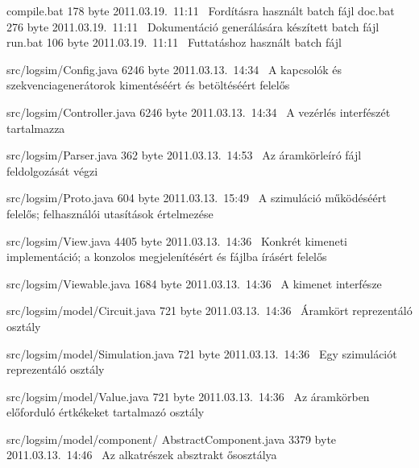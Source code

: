\begin{fajllista}

\fajl
{compile.bat} %
{178 byte} %
{2011.03.19.~11:11~} %
{Fordításra használt batch fájl} %
\fajl
{doc.bat} %
{276 byte} %
{2011.03.19.~11:11~} %
{Dokumentáció generálására készített batch fájl} %
\fajl
{run.bat} %
{106 byte} %
{2011.03.19.~11:11~} %
{Futtatáshoz használt batch fájl} %

\fajl
{src/logsim/Config.java} %
{6246 byte} %
{2011.03.13.~14:34~} %
{A kapcsolók és szekvenciagenerátorok kimentéséért és betöltéséért felelős} %

\fajl
{src/logsim/Controller.java} %
{6246 byte} %
{2011.03.13.~14:34~} %
{A vezérlés interfészét tartalmazza} %

\fajl
{src/logsim/Parser.java} %
{362 byte} %
{2011.03.13.~14:53~} %
{Az áramkörleíró fájl feldolgozását végzi} %

\fajl
{src/logsim/Proto.java} %
{604 byte} %
{2011.03.13.~15:49~} %
{A szimuláció működéséért felelős; felhasználói utasítások értelmezése} %

\fajl
{src/logsim/View.java} %
{4405 byte} %
{2011.03.13.~14:36~} %
{Konkrét kimeneti implementáció; a konzolos megjelenítésért és fájlba írásért felelős} %

\fajl
{src/logsim/Viewable.java} %
{1684 byte} %
{2011.03.13.~14:36~} %
{A kimenet interfésze} %

\fajl
{src/logsim/model/Circuit.java} %
{721 byte} %
{2011.03.13.~14:36~} %
{Áramkört reprezentáló osztály} %

\fajl
{src/logsim/model/Simulation.java} %
{721 byte} %
{2011.03.13.~14:36~} %
{Egy szimulációt reprezentáló osztály} %

\fajl
{src/logsim/model/Value.java} %
{721 byte} %
{2011.03.13.~14:36~} %
{Az áramkörben előforduló értkékeket tartalmazó osztály} %

\fajl
{src/logsim/model/component/\newline
AbstractComponent.java} %
{3379 byte} %
{2011.03.13.~14:46~} %
{Az alkatrészek absztrakt ősosztálya} %


\end{fajllista}
